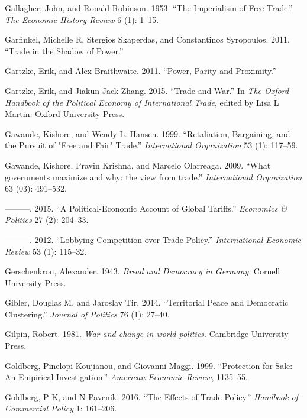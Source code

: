 \documentclass{puthesis}
\newlength{\cslhangindent}
\newenvironment{cslreferences}%
  {\setlength{\parindent}{0pt}%
  \everypar{\setlength{\hangindent}{\cslhangindent}}\ignorespaces}%
  {\par}
\begin{document}
\begin{cslreferences}
\leavevmode\hypertarget{ref-Gallagher1953}{}%
Gallagher, John, and Ronald Robinson. 1953. ``The Imperialism of Free
Trade.'' \emph{The Economic History Review} 6 (1): 1--15.

\leavevmode\hypertarget{ref-Garfinkel2011}{}%
Garfinkel, Michelle R, Stergios Skaperdas, and Constantinos Syropoulos.
2011. ``Trade in the Shadow of Power.''

\leavevmode\hypertarget{ref-Gartzke2011}{}%
Gartzke, Erik, and Alex Braithwaite. 2011. ``Power, Parity and
Proximity.''

\leavevmode\hypertarget{ref-Gartzke2015}{}%
Gartzke, Erik, and Jiakun Jack Zhang. 2015. ``Trade and War.'' In
\emph{The Oxford Handbook of the Political Economy of International
Trade}, edited by Lisa L Martin. Oxford University Press.

\leavevmode\hypertarget{ref-Gawande1999}{}%
Gawande, Kishore, and Wendy L. Hansen. 1999. ``Retaliation, Bargaining,
and the Pursuit of "Free and Fair" Trade.'' \emph{International
Organization} 53 (1): 117--59.

\leavevmode\hypertarget{ref-Gawande2009}{}%
Gawande, Kishore, Pravin Krishna, and Marcelo Olarreaga. 2009. ``What
governments maximize and why: the view from trade.'' \emph{International
Organization} 63 (03): 491--532.

\leavevmode\hypertarget{ref-Gawande2015}{}%
---------. 2015. ``A Political-Economic Account of Global Tariffs.''
\emph{Economics \& Politics} 27 (2): 204--33.

\leavevmode\hypertarget{ref-Gawande2012}{}%
---------. 2012. ``Lobbying Competition over Trade Policy.''
\emph{International Economic Review} 53 (1): 115--32.

\leavevmode\hypertarget{ref-Gerschenkron1943}{}%
Gerschenkron, Alexander. 1943. \emph{Bread and Democracy in Germany}.
Cornell University Press.

\leavevmode\hypertarget{ref-Gibler2014}{}%
Gibler, Douglas M, and Jaroslav Tir. 2014. ``Territorial Peace and
Democratic Clustering.'' \emph{Journal of Politics} 76 (1): 27--40.

\leavevmode\hypertarget{ref-Gilpin1981}{}%
Gilpin, Robert. 1981. \emph{War and change in world politics}. Cambridge
University Press.

\leavevmode\hypertarget{ref-Goldberg1999}{}%
Goldberg, Pinelopi Koujianou, and Giovanni Maggi. 1999. ``Protection for
Sale: An Empirical Investigation.'' \emph{American Economic Review},
1135--55.

\leavevmode\hypertarget{ref-Goldberg2016}{}%
Goldberg, P K, and N Pavcnik. 2016. ``The Effects of Trade Policy.''
\emph{Handbook of Commercial Policy} 1: 161--206.


\end{cslreferences}
\end{document}
